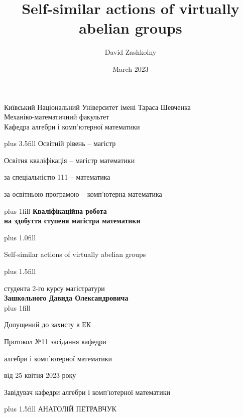 \documentclass[a4paper,12pt]{amsart}
\title{ 	Self-similar actions of virtually abelian groups }
\author{ David Zashkolny }
\date{March 2023}
\theoremstyle{definition}
\begin{document}
	
	
	
	\thispagestyle {empty}
	\begin{center}
		\large  Київський Національний Університет імені Тараса Шевченка \\
		Механіко-математичний факультет \\
		Кафедра алгебри і комп'ютерної математики \par
	\end{center}
	
	\vskip0cm plus 3.5fill
	Освітній рівень -- магістр	
	
	Освітня кваліфікація -- магістр математики 
	
	за спеціальністю 111 -- математика 
	
	за освітньою програмою -- комп'ютерна математика 
	
	
	\begin{center}
		\vskip0cm plus 1fill
		\vspace{2.5cm} {\bf Кваліфікаційна робота}\\
		
		{\bf на здобуття ступеня магістра математики}\\
	\end{center}
	
	
	\vskip0cm plus 1.0fill

	
	
	\begin{center}\bf
		{\LARGE
			Self-similar actions of virtually abelian groups 
			\par}
	\end{center}
	
	\vskip0cm plus 1.5fill
	
	\hangindent=7cm  \noindent
	студента 2-го курсу магістратури\\
	{\bf Зашкольного Давида Олександровича}\\
	
	
	\vskip0cm plus 1fill
	
	Допущений до захисту в ЕК
	
	Протокол №11 засідання кафедри 
	
	алгебри і комп'ютерної математики 
	
	від 25 квітня 2023 року 
	
	Завідувач кафедри алгебри і комп'ютерної математики 
	
	\begin{center}
		
		\vskip0cm plus 1.5fill
		АНАТОЛІЙ ПЕТРАВЧУК
	\end{center}
	
\end{document}
